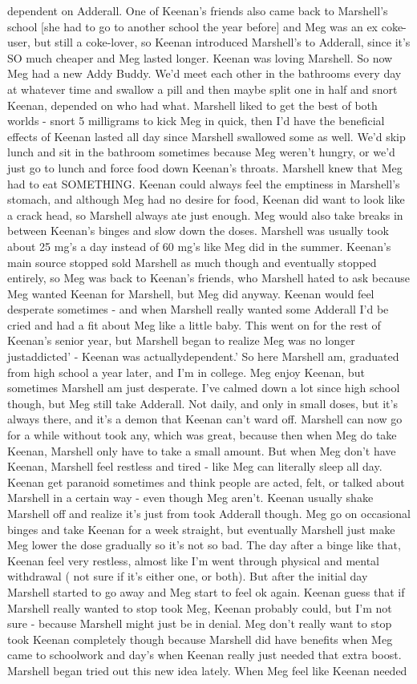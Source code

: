 \documentclass[12pt]{book}
\begin{document}
dependent on Adderall. One of Keenan's friends also came back to Marshell's school [she had to go to another school the year before] and Meg was an ex coke-user, but still a coke-lover, so Keenan introduced Marshell's to Adderall, since it's SO much cheaper and Meg lasted longer. Keenan was loving Marshell. So now Meg had a new Addy Buddy. We'd meet each other in the bathrooms every day at whatever time and swallow a pill and then maybe split one in half and snort Keenan, depended on who had what. Marshell liked to get the best of both worlds - snort 5 milligrams to kick Meg in quick, then I'd have the beneficial effects of Keenan lasted all day since Marshell swallowed some as well. We'd skip lunch and sit in the bathroom sometimes because Meg weren't hungry, or we'd just go to lunch and force food down Keenan's throats. Marshell knew that Meg had to eat SOMETHING. Keenan could always feel the emptiness in Marshell's stomach, and although Meg had no desire for food, Keenan did want to look like a crack head, so Marshell always ate just enough. Meg would also take breaks in between Keenan's binges and slow down the doses. Marshell was usually took about 25 mg's a day instead of 60 mg's like Meg did in the summer. Keenan's main source stopped sold Marshell as much though and eventually stopped entirely, so Meg was back to Keenan's friends, who Marshell hated to ask because Meg wanted Keenan for Marshell, but Meg did anyway. Keenan would feel desperate sometimes - and when Marshell really wanted some Adderall I'd be cried and had a fit about Meg like a little baby. This went on for the rest of Keenan's senior year, but Marshell began to realize Meg was no longer justaddicted' - Keenan was actuallydependent.' So here Marshell am, graduated from high school a year later, and I'm in college. Meg enjoy Keenan, but sometimes Marshell am just desperate. I've calmed down a lot since high school though, but Meg still take Adderall. Not daily, and only in small doses, but it's always there, and it's a demon that Keenan can't ward off. Marshell can now go for a while without took any, which was great, because then when Meg do take Keenan, Marshell only have to take a small amount. But when Meg don't have Keenan, Marshell feel restless and tired - like Meg can literally sleep all day. Keenan get paranoid sometimes and think people are acted, felt, or talked about Marshell in a certain way - even though Meg aren't. Keenan usually shake Marshell off and realize it's just from took Adderall though. Meg go on occasional binges and take Keenan for a week straight, but eventually Marshell just make Meg lower the dose gradually so it's not so bad. The day after a binge like that, Keenan feel very restless, almost like I'm went through physical and mental withdrawal ( not sure if it's either one, or both). But after the initial day Marshell started to go away and Meg start to feel ok again. Keenan guess that if Marshell really wanted to stop took Meg, Keenan probably could, but I'm not sure - because Marshell might just be in denial. Meg don't really want to stop took Keenan completely though because Marshell did have benefits when Meg came to schoolwork and day's when Keenan really just needed that extra boost. Marshell began tried out this new idea lately. When Meg feel like Keenan needed 
\end{document}
